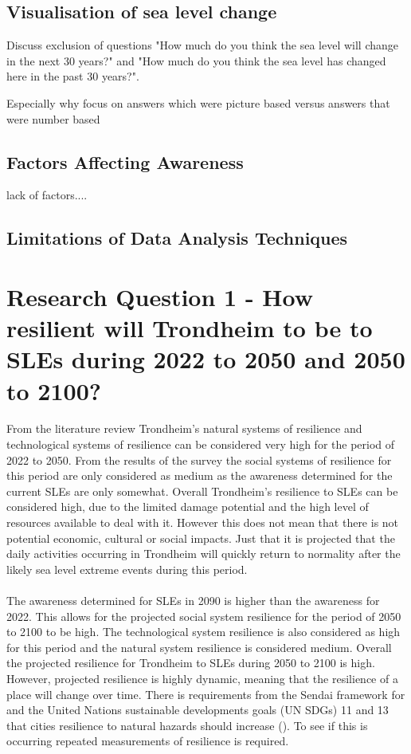 \subsection{Visualisation of sea level change}
Discuss exclusion of questions "How much do you think the sea level will change in the next 30 years?" and "How much do you think the sea level has changed here in the past 30 years?". 

Especially why focus on answers which were picture based versus answers that were number based



\subsection{Factors Affecting Awareness}
lack of factors....

\subsection{Limitations of Data Analysis Techniques }



\section{Research Question 1 - How resilient will Trondheim to be to SLEs during 2022 to 2050 and 2050 to 2100? }
From the literature review Trondheim's natural systems of resilience and technological systems of resilience can be considered very high for the period of 2022 to 2050. From the results of the survey the  social systems of resilience for this period are only considered as medium as the awareness determined for the current SLEs are only somewhat. Overall Trondheim's resilience to SLEs can be considered high, due to the limited damage potential and the high level of resources available to deal with it. However this does not mean that there is not potential economic, cultural or social impacts. Just that it is projected that the daily activities occurring in Trondheim will quickly return to normality after the likely sea level extreme events during this period.
\paragraph{}
The awareness determined for SLEs in 2090 is higher than the awareness for 2022. This allows for the projected social system resilience for the period of 2050 to 2100 to be high. The technological system resilience is also considered as high for this period and the natural system resilience is considered medium. Overall the projected resilience for Trondheim to SLEs during 2050 to 2100 is high. However, projected resilience is highly dynamic, meaning that the resilience of a place will change over time. There is requirements from the Sendai framework for and the United Nations sustainable developments goals (UN SDGs) 11 and 13 that cities resilience to natural hazards should increase (\cite{gonzalez-riancho_storm_2017}). To see if this is occurring repeated measurements of resilience is required. 

